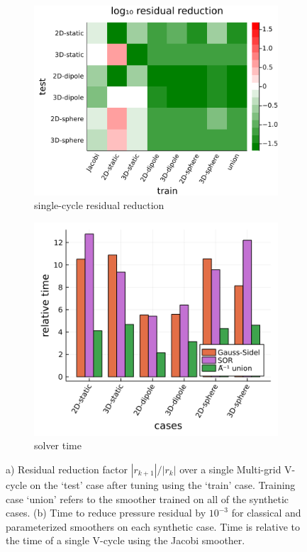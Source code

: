 \documentclass[review]{elsarticle}
\begin{document}
\begin{figure}
    \centering
    \begin{subfigure}[b]{0.47\textwidth}
        \centering
        \includegraphics[width=\textwidth]{figures/crossloss.png}
        \caption{single-cycle residual reduction}
        \label{fig:cross plot}
    \end{subfigure}
    \hfill
    \begin{subfigure}[b]{0.47\textwidth}
        \centering
        \includegraphics[width=\textwidth]{figures/synthetic_timing.png}
        \caption{solver time}
        \label{fig:synthetic time}
    \end{subfigure}
    \caption{a) Residual reduction factor $|r_{k+1}|/|r_k|$ over a single Multi-grid V-cycle on the `test' case after tuning using the `train' case. Training case `union' refers to the smoother trained on all of the synthetic cases. (b) Time to reduce pressure residual by $10^{-3}$ for classical and parameterized smoothers on each synthetic case. Time is relative to the time of a single V-cycle using the Jacobi smoother.}
    \label{fig:synthetic results}
\end{figure}
\end{document}
